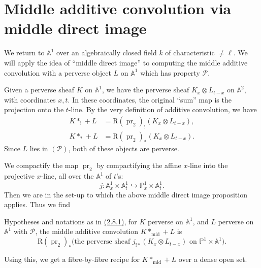 \section{Middle additive convolution via middle direct image}
\label{sec:2.8}

We return to \(\mathbb{A}^1\) over an algebraically closed field \(k\) of
characteristic \(\neq\ell\). We will apply the idea of ``middle direct image''
to computing the middle additive convolution with a perverse object \(L\) on
\(\mathbb{A}^1\) which has property \(\mathcal{P}\).

Given a perverse sheaf \(K\) on \(\mathbb{A}^1\), we have the perverse sheaf
\(K_x\otimes L_{t-x}\) on \(\mathbb{A}^2\), with coordinates \(x,t\). In these
coordinates, the original ``sum'' map is the projection onto the \(t\)-line. By
the very definition of additive convolution, we have
\[
  \begin{aligned}
    K*_!+L &= \mathrm{R}(\operatorname{pr}_2)_!(K_x\otimes L_{t-x}),\\
    K*_*+L &= \mathrm{R}(\operatorname{pr}_2)_*(K_x\otimes L_{t-x}).
  \end{aligned}
\]
Since \(L\) lies in \((\mathcal{P})\), both of these objects are perverse.

We compactify the map \(\operatorname{pr}_2\) by compactifying the affine
\(x\)-line into the projective \(x\)-line, all over the \(\mathbb{A}^1\) of
\(t\)'s:
\[
  j:\mathbb{A}^1_x\times\mathbb{A}^1_t
  \hookrightarrow
  \mathbb{P}^1_x\times\mathbb{A}^1_t.
\]
Then we are in the set-up to which the above middle direct image proposition
applies. Thus we find

Hypotheses and notations as in \hyperref[par:2.8.1]{(2.8.1)}, for \(K\) perverse on
\(\mathbb{A}^1\), and \(L\) perverse on \(\mathbb{A}^1\) with
\(\mathcal{P}\), the middle additive convolution \(K*_{\mathrm{mid}}+L\) is
\[
  \mathrm{R}(\operatorname{pr}_2)_*
  \bigl(\text{the perverse sheaf } j_{!*}(K_x\otimes L_{t-x})
  \text{ on } \mathbb{P}^1\times\mathbb{A}^1\bigr).
\]

Using this, we get a fibre-by-fibre recipe for \(K*_{\mathrm{mid}}+L\) over a
dense open set.

